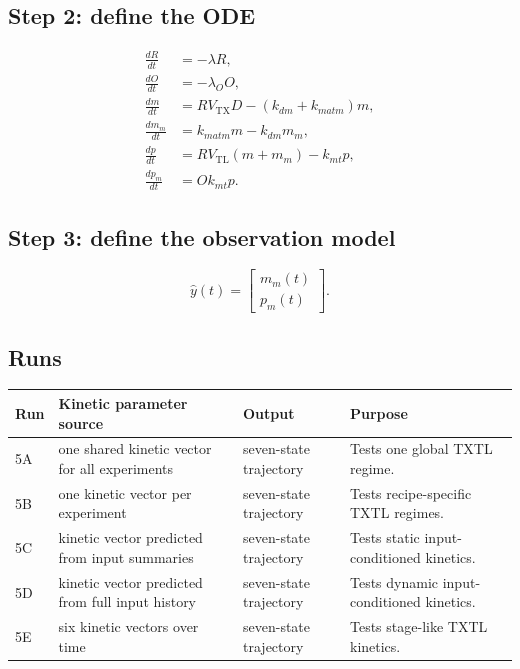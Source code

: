 \documentclass[11pt]{article}
\newcommand{\TX}{\mathrm{TX}}
\newcommand{\TL}{\mathrm{TL}}
\begin{document}
\subsection{Step 2: define the ODE}

\begin{align}
    \frac{dR}{dt} &= -\lambda R, \\
    \frac{dO}{dt} &= -\lambda_O O, \\
    \frac{dm}{dt} &= R V_{\TX}D-(k_{dm}+k_{matm})m, \\
    \frac{dm_m}{dt} &= k_{matm}m-k_{dm}m_m, \\
    \frac{dp}{dt} &= R V_{\TL}(m+m_m)-k_{mt}p, \\
    \frac{dp_m}{dt} &= O k_{mt}p.
\end{align}

\subsection{Step 3: define the observation model}

\begin{equation}
    \widehat{y}(t)=
    \begin{bmatrix}
        m_m(t)\\
        p_m(t)
    \end{bmatrix}.
\end{equation}

\subsection{Runs}

\begin{center}
\begin{tabularx}{\textwidth}{lllX}
\toprule
Run & Kinetic parameter source & Output & Purpose \\
\midrule
5A & one shared kinetic vector for all experiments & seven-state trajectory & Tests one global TXTL regime. \\
5B & one kinetic vector per experiment & seven-state trajectory & Tests recipe-specific TXTL regimes. \\
5C & kinetic vector predicted from input summaries & seven-state trajectory & Tests static input-conditioned kinetics. \\
5D & kinetic vector predicted from full input history & seven-state trajectory & Tests dynamic input-conditioned kinetics. \\
5E & six kinetic vectors over time & seven-state trajectory & Tests stage-like TXTL kinetics. \\
\bottomrule
\end{tabularx}
\end{center}
\end{document}
